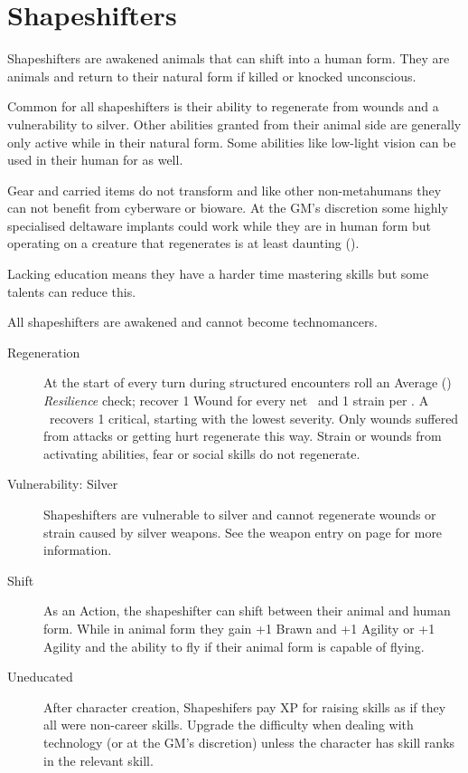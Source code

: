 \documentclass{book}
\begin{document}
\section{Shapeshifters}
\label{sec:shapeshifters}
\begin{multicols}{2}
Shapeshifters are awakened animals that can shift into a human form. They are animals and return to their natural form if killed or knocked unconscious. 

Common for all shapeshifters is their ability to regenerate from wounds and a vulnerability to silver. Other abilities granted from their animal side are generally only active while in their natural form. Some abilities like low-light vision can be used in their human for as well.

Gear and carried items do not transform and like other non-metahumans they can not benefit from cyberware or bioware. At the GM's discretion some highly specialised deltaware implants could work while they are in human form but operating on a creature that regenerates is at least daunting (\DifficultyDie \DifficultyDie \DifficultyDie \DifficultyDie).

Lacking education means they have a harder time mastering skills but some talents can reduce this.

All shapeshifters are awakened and cannot become technomancers.


\begin{description}
	\item[Regeneration] At the start of every turn during structured encounters roll an Average (\DifficultyDie \DifficultyDie) \emph{Resilience} check; recover 1 Wound for every net \Success\ and 1 strain per \Advantage. A \Triumph\ recovers 1 critical, starting with the lowest severity. Only wounds suffered from attacks or getting hurt regenerate this way. Strain or wounds from activating abilities, fear or social skills do not regenerate.
	\item[Vulnerability: Silver] Shapeshifters are vulnerable to silver and cannot regenerate wounds or strain caused by silver weapons. See the weapon entry on page \pageref{silver} for more information.
	\item[Shift] As an Action, the shapeshifter can shift between their animal and human form. While in animal form they gain +1 Brawn and +1 Agility or +1 Agility and the ability to fly if their animal form is capable of flying.
	\item[Uneducated] \label{uneducated} After character creation, Shapeshifers pay XP for raising skills as if they all were non-career skills. Upgrade the difficulty when dealing with technology (or at the GM's discretion) unless the character has skill ranks in the relevant skill.  
\end{description}

\end{multicols}
\end{document}
